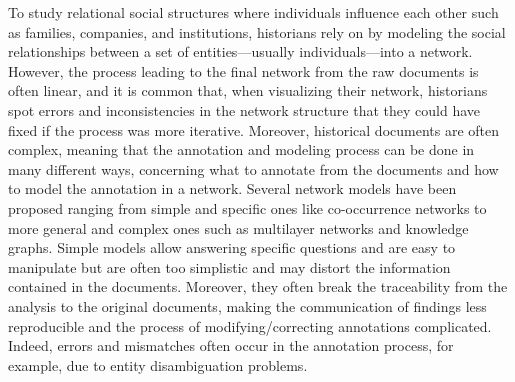 To study relational social structures where individuals influence each other such as families, companies, and institutions, historians rely on \hsna by modeling the social relationships between a set of entities---usually individuals---into a network.
However, the process leading to the final network from the raw documents is often linear, and it is common that, when visualizing their network, historians spot errors and inconsistencies in the network structure that they could have fixed if the process was more iterative\cite{alkadi2022}.
Moreover, historical documents are often complex, meaning that the annotation and modeling process can be done in many different ways, concerning what to annotate from the documents\cite{lemercierBackSourcesPracticing2021} and how to model the annotation in a network\cite{cristofoliAuxSourcesGrands2008}.
Several network models have been proposed ranging from simple and specific ones like co-occurrence networks to more general and complex ones such as multilayer networks and knowledge graphs.
Simple models allow answering specific questions and are easy to manipulate but are often too simplistic and may distort the information contained in the documents.
Moreover, they often break the traceability from the analysis to the original documents, making the communication of findings less reproducible and the process of modifying/correcting annotations complicated.
Indeed, errors and mismatches often occur in the annotation process, for example, due to entity disambiguation problems\cite{diesnerImpactEntityDisambiguation2015}.
